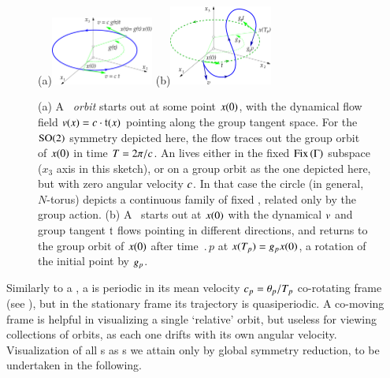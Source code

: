 %
\begin{figure}[ht]
(a)\includegraphics[width=0.3\textwidth]{../Fig/reqv.eps}
(b)\includegraphics[width=0.3\textwidth]{../Fig/rpo.eps}
\caption{
(a) A {\em \reqv\ orbit} starts out at some point $x(0)$,
with the dynamical flow field $v(x) = c \cdot
\mathfrak{t}(x)$ pointing along the group tangent space. For
the $\textrm{SO}(2)$ symmetry depicted here, the flow traces out the
group orbit of $x(0)$ in time ${T_{}}=2\pi/c$.
An
{\em \eqv} lives either in the fixed $\mathrm{Fix}\left(\Gamma\right)$ subspace
($x_3$ axis in this sketch), or on a group orbit as the one
depicted here, but with zero angular velocity $c$. In
that case the circle (in general, $N$-torus) depicts a
continuous family of fixed \eqva, related only by the group
action.
(b) A \rpo\ starts out at $x(0)$ with the dynamical $v$ and
group tangent $\mathfrak{t}$ flows pointing in different
directions, and returns to the group orbit of $x(0)$ after
time $\period{p}$ at $x({T_{p}})=g_p x (0)$, a
rotation of the initial point by $g_p$.
}
\label{f:rpo}
\end{figure}

Similarly to a \reqv, a \emph{\rpo} is periodic in its
mean velocity $c_p={\bf \theta}_p/{T_{p}}$ co-rotating
frame (see ), but in the
stationary frame its trajectory is quasiperiodic.
A co-moving
frame is helpful in visualizing a single `relative' orbit,
but useless for viewing collections of orbits, as each one
drifts with its own angular velocity. Visualization of all
\rpo s as \po s we attain only by global symmetry reduction,
to be undertaken in the following.

